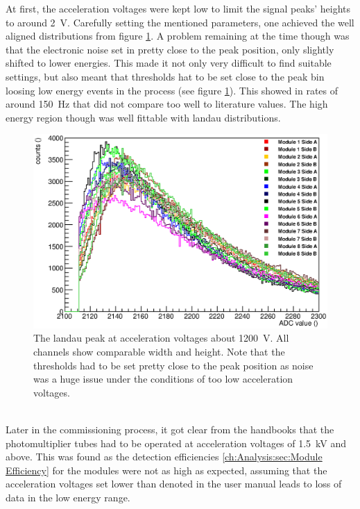 	At first, the acceleration voltages were kept low to limit the signal peaks' heights to around \SI{2}{\volt}. Carefully setting the mentioned parameters, one achieved the well aligned distributions from figure \ref{fig:allPeaksBefore}. A problem remaining at the time though was that the electronic noise set in pretty close to the peak position, only slightly shifted to lower energies. This made it not only very difficult to find suitable settings, but also meant that thresholds hat to be set close to the peak bin loosing low energy events in the process (see figure \ref{fig:allPeaksBefore}). This showed in rates of around \SI{150}{\hertz} that did not compare too well to literature values. The high energy region though was well fittable with landau distributions.\\
	\begin{figure}
		\centering
		\includegraphics[width = 0.9 \textwidth]{graphics/setup/LandauPeaksRun660_old.eps}
		\caption[Landau peak \SI{1200}{\volt} acceleration voltage]{The landau peak at acceleration voltages about \SI{1200}{\volt}. All channels show comparable width and height. Note that the thresholds had to be set pretty close to the peak position as noise was a huge issue under the conditions of too low acceleration voltages.}
		\label{fig:allPeaksBefore}
	\end{figure}\\
	Later in the commissioning process, it got clear from the handbooks that the photomultiplier tubes had to be operated at acceleration voltages of \SI{1.5}{\kilo\volt} and above. 
	This was found as the detection efficiencies \ref{ch:Analysis:sec:Module Efficiency} for the modules were not as high as expected, assuming that the acceleration voltages set lower than denoted in the user manual leads to loss of data in the low energy range.
